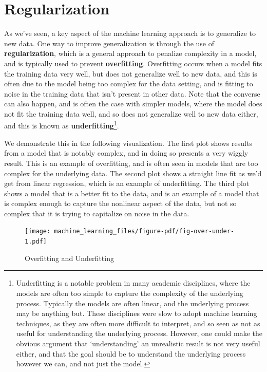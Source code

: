 \documentclass[
  letterpaper,
]{krantz}
\begin{document}
\section{Regularization}\label{sec-ml-regularization}

As we've seen, a key aspect of the machine learning approach is to
generalize to new data. One way to improve generalization is through the
use of \textbf{regularization}, which is a general approach to penalize
complexity in a model, and is typically used to prevent
\textbf{overfitting}. Overfitting occurs when a model fits the training
data very well, but does not generalize well to new data, and this is
often due to the model being too complex for the data setting, and is
fitting to noise in the training data that isn't present in other data.
Note that the converse can also happen, and is often the case with
simpler models, where the model does not fit the training data well, and
so does not generalize well to new data either, and this is known as
\textbf{underfitting}\footnote{Underfitting is a notable problem in many
  academic disciplines, where the models are often too simple to capture
  the complexity of the underlying process. Typically the models are
  often linear, and the underlying process may be anything but. These
  disciplines were slow to adopt machine learning techniques, as they
  are often more difficult to interpret, and so seen as not as useful
  for understanding the underlying process. However, one could make the
  obvious argument that `understanding' an unrealistic result is not
  very useful either, and that the goal should be to understand the
  underlying process however we can, and not just the model.}.

We demonstrate this in the following visualization. The first plot shows
results from a model that is notably complex, and in doing so presents a
very wiggly result. This is an example of overfitting, and is often seen
in models that are too complex for the underlying data. The second plot
shows a straight line fit as we'd get from linear regression, which is
an example of underfitting. The third plot shows a model that is a
better fit to the data, and is an example of a model that is complex
enough to capture the nonlinear aspect of the data, but not so complex
that it is trying to capitalize on noise in the data.

\begin{figure}

{\centering \texttt{[image: machine\_learning\_files/figure-pdf/fig-over-under-1.pdf]}

}

\caption{\label{fig-over-under}Overfitting and Underfitting}

\end{figure}
\end{document}
